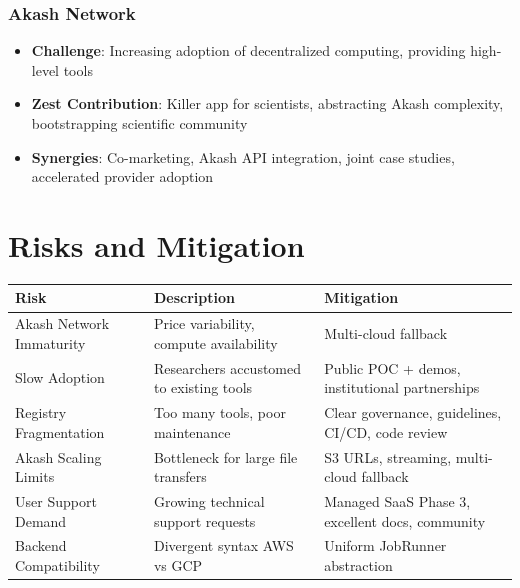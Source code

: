 \documentclass[11pt,a4paper]{article}
\begin{document}
	\subsubsection{Akash Network}
	
	\begin{itemize}
		\item \textbf{Challenge}: Increasing adoption of decentralized computing, providing high-level tools
		\item \textbf{Zest Contribution}: Killer app for scientists, abstracting Akash complexity, bootstrapping scientific community
		\item \textbf{Synergies}: Co-marketing, Akash API integration, joint case studies, accelerated provider adoption
	\end{itemize}
	
	\newpage
	
	\section{Risks and Mitigation}
	
	\begin{table}[H]
		\centering
		\small
		\begin{tabularx}{\linewidth}{l | p{5.5cm} | p{4cm}}
			\toprule
			\textbf{Risk} & \textbf{Description} & \textbf{Mitigation} \\
			\midrule
			Akash Network Immaturity & Price variability, compute availability & Multi-cloud fallback \\
			Slow Adoption & Researchers accustomed to existing tools & Public POC + demos, institutional partnerships \\
			Registry Fragmentation & Too many tools, poor maintenance & Clear governance, guidelines, CI/CD, code review \\
			Akash Scaling Limits & Bottleneck for large file transfers & S3 URLs, streaming, multi-cloud fallback \\
			User Support Demand & Growing technical support requests & Managed SaaS Phase 3, excellent docs, community \\
			Backend Compatibility & Divergent syntax AWS vs GCP & Uniform JobRunner abstraction \\
			\bottomrule
		\end{tabularx}
	\end{table}
	
\end{document}

